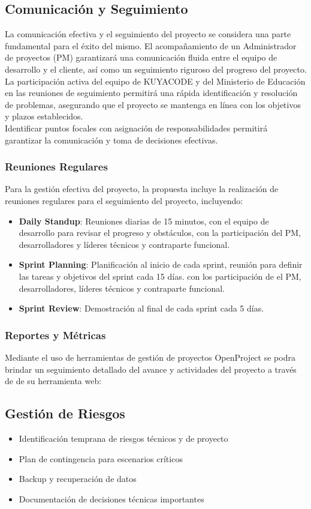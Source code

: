 \subsection{Comunicación y Seguimiento}
La comunicación efectiva y el seguimiento del proyecto se considera una parte fundamental para el éxito del mismo. El acompañamiento de un Administrador de proyectos (PM) garantizará una comunicación fluida entre el equipo de desarrollo y el cliente, así como un seguimiento riguroso del progreso del proyecto.\\
La participación activa del equipo de KUYACODE y del Ministerio de Educación en las reuniones de seguimiento permitirá una rápida identificación y resolución de problemas, asegurando que el proyecto se mantenga en línea con los objetivos y plazos establecidos.\\
Identificar puntos focales con asignación de responsabilidades permitirá garantizar la comunicación y toma de decisiones efectivas.
\subsubsection{Reuniones Regulares}
Para la gestión efectiva del proyecto, la propuesta incluye la realización de reuniones regulares para el seguimiento del proyecto, incluyendo:
\begin{itemize}
    \item \textbf{Daily Standup}: Reuniones diarias de 15 minutos, con el equipo de desarrollo para revisar el progreso y obstáculos, con la participación del PM, desarrolladores y líderes técnicos y contraparte funcional.
    \item \textbf{Sprint Planning}: Planificación al inicio de cada sprint, reunión para definir las tareas y objetivos del sprint cada 15 días. con los participación de el PM, desarrolladores, líderes técnicos y contraparte funcional.
    \item \textbf{Sprint Review}: Demostración al final de cada sprint cada 5 días.
\end{itemize}
\subsubsection{Reportes y Métricas}
Mediante el uso de herramientas de gestión de proyectos OpenProject se podra brindar un seguimiento detallado del avance y actividades del proyecto a través de de su herramienta web:
\subsection{Gestión de Riesgos}
\begin{itemize}
    \item Identificación temprana de riesgos técnicos y de proyecto
    \item Plan de contingencia para escenarios críticos
    \item Backup y recuperación de datos
    \item Documentación de decisiones técnicas importantes
\end{itemize}